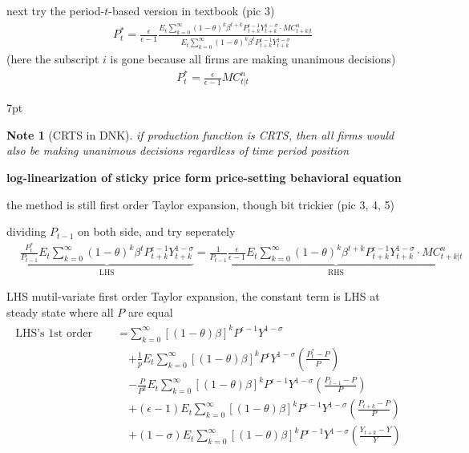 \documentclass{article}
\newenvironment{blueblock}{
\def\FrameCommand{
  \hspace{1pt}
    {\color{DarkBlue}
    \vrule width 2pt}
    {\color{blueshade}
    \vrule width 4pt}
  \colorbox{blueshade}
}
\MakeFramed{
  \advance
  \hsize-
  \width
  \FrameRestore}
\noindent\hspace{-4.55pt}%
\begin{adjustwidth}{}{7pt}
\vspace{2pt}\vspace{2pt}
}
{\vspace{2pt}\end{adjustwidth}\endMakeFramed}
\newtheorem{note}{Note}
\begin{document}
next try the period-$t$-based version in textbook (pic 3)
\begin{align}
&P_{t}^{*} =\frac{\epsilon}{\epsilon-1}\frac{E_{t}\sum\limits_{k=0}^{\infty}(1-\theta)^{k} \beta^{t+k} P_{t+k}^{\epsilon-1} Y_{t+k}^{1-\sigma} \cdot MC_{t+k|t}^{n}}{E_{t}\sum\limits_{k=0}^{\infty}(1-\theta)^{k} \beta^{t} P_{t+k}^{\epsilon-1}Y_{t+k}^{1-\sigma}}
\end{align}
(here the subscript $i$ is gone because all firms are making unanimous decisions)
\begin{align}
& P_{t}^{*}=\frac{\epsilon}{\epsilon-1} MC_{t|t}^{n}
\end{align}


\begin{blueblock}
\begin{note}[CRTS in DNK]
if production function is CRTS, then all firms would also be making unanimous decisions regardless of time period position
\end{note}
\end{blueblock}

\textbf{log-linearization of sticky price form price-setting behavioral equation}

the method is still first order Taylor expansion, though bit trickier (pic 3, 4, 5)

dividing $P_{t-1}$ on both side, and try seperately
\begin{align}
& \underbrace{\frac{P_{t}^{*}}{P_{t-1}}E_{t}\sum\limits_{k=0}^{\infty}(1-\theta)^{k} \beta^{t} P_{t+k}^{\epsilon-1}Y_{t+k}^{1-\sigma}}_{\text{LHS}}
=
\underbrace{\frac{1}{P_{t-1}}\frac{\epsilon}{\epsilon-1}E_{t}\sum\limits_{k=0}^{\infty}(1-\theta)^{k} \beta^{t+k} P_{t+k}^{\epsilon-1} Y_{t+k}^{1-\sigma} \cdot MC_{t+k|t}^{n}}_{\text{RHS}}
\end{align}

LHS mutil-variate first order Taylor expansion, the constant term is LHS at steady state where all $P$ are equal
\begin{align}
\begin{split}
 \text{LHS's 1st order Taylor expansion}=&\sum\limits_{k=0}^{\infty}[(1-\theta)\beta]^{k}P^{\epsilon-1}Y^{1-\sigma}
\\& +\frac{1}{p}E_{t}\sum\limits_{k=0}^{\infty}[(1-\theta)\beta]^{k}P^{\epsilon}Y^{1-\sigma}( \frac{P_{t}^{*}-P}{P})
\\& - \frac{P}{P^{2}}E_{t}\sum\limits_{k=0}^{\infty}[(1-\theta)\beta]^{k}P^{\epsilon-1}Y^{1-\sigma}( \frac{P_{t-1}-P}{P})
\\& +(\epsilon-1)E_{t}\sum\limits_{k=0}^{\infty}[(1-\theta)\beta]^{k}P^{\epsilon-1}Y^{1-\sigma}( \frac{P_{t+k}-P}{P})
\\& +(1-\sigma)E_{t}\sum\limits_{k=0}^{\infty}[(1-\theta)\beta]^{k}P^{\epsilon-1}Y^{1-\sigma}( \frac{Y_{t+k}-Y}{Y})
\end{split}
\end{align}
\end{document}
